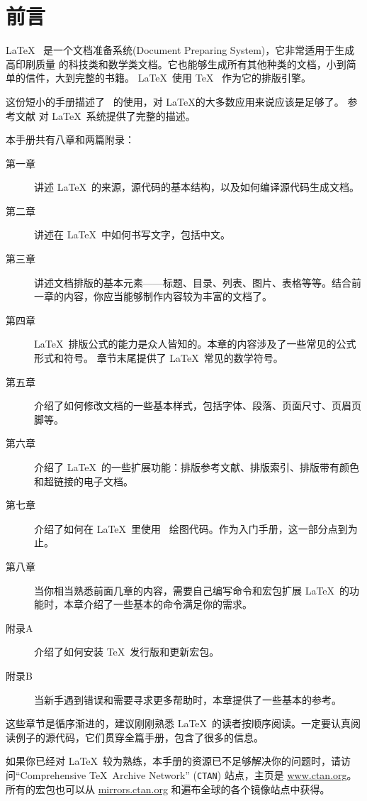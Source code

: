 \chapter{前言}

\LaTeX\ \cite{manual} 是一个文档准备系统(Document Preparing System)，它非常适用于生成高印刷质量
的科技类和数学类文档。它也能够生成所有其他种类的文档，小到简单的信件，大到完整的书籍。
\LaTeX~使用 \TeX\ \cite{texbook} 作为它的排版引擎。%

这份短小的手册描述了 \LaTeXe\ 的使用，对 \LaTeX 的大多数应用来说应该是足够了。
参考文献 \cite{manual,companion} 对 \LaTeX\ 系统提供了完整的描述。%

\bigskip
本手册共有八章和两篇附录：%
\begin{description}%
\item[第一章] 讲述 \LaTeX\ 的来源，源代码的基本结构，以及如何编译源代码生成文档。
\item[第二章] 讲述在 \LaTeX\ 中如何书写文字，包括中文。%
\item[第三章] 讲述文档排版的基本元素——标题、目录、列表、图片、表格等等。结合前一章的内容，你应当能够制作内容较为丰富的文档了。%
\item[第四章] \LaTeX\ 排版公式的能力是众人皆知的。本章的内容涉及了一些常见的公式形式和符号。
              章节末尾提供了 \LaTeX\ 常见的数学符号。%
\item[第五章] 介绍了如何修改文档的一些基本样式，包括字体、段落、页面尺寸、页眉页脚等。
\item[第六章] 介绍了 \LaTeX\ 的一些扩展功能：排版参考文献、排版索引、排版带有颜色和超链接的电子文档。
\item[第七章] 介绍了如何在 \LaTeX\ 里使用 \TikZ\ 绘图代码。作为入门手册，这一部分点到为止。
\item[第八章] 当你相当熟悉前面几章的内容，需要自己编写命令和宏包扩展 \LaTeX\ 的功能时，本章介绍了一些基本的命令满足你的需求。
\end{description}%
\begin{description}
\item[附录A] 介绍了如何安装 \TeX\ 发行版和更新宏包。
\item[附录B] 当新手遇到错误和需要寻求更多帮助时，本章提供了一些基本的参考。
\end{description}

\bigskip
这些章节是循序渐进的，建议刚刚熟悉 \LaTeX\ 的读者按顺序阅读。一定要认真阅读例子的源代码，它们贯穿全篇手册，包含了很多的信息。%

\bigskip
如果你已经对 \LaTeX\ 较为熟练，本手册的资源已不足够解决你的问题时，请访问``Comprehensive
\TeX\ Archive Network'' (\texttt{CTAN}) 站点，主页是 \url{www.ctan.org}。
所有的宏包也可以从 \url{mirrors.ctan.org} 和遍布全球的各个镜像站点中获得。

